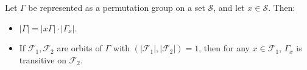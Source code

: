 Let $\Gamma$ be represented as a permutation group on a set $\mathcal{S}$, and let $x \in \mathcal{S}$. Then:
\begin{itemize}
\item[(a)] $|\Gamma| = |x\Gamma| \cdot |\Gamma_x|$.
\item[(b)] If $\mathcal{F}_1, \mathcal{F}_2$ are orbits of $\Gamma$ with $(|\mathcal{F}_1|, |\mathcal{F}_2|) = 1$, then for any $x \in \mathcal{F}_1$, $\Gamma_x$ is transitive on $\mathcal{F}_2$.
\end{itemize}
